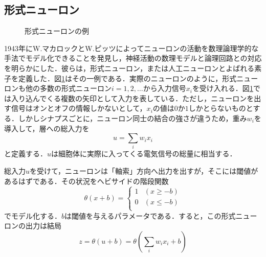 \documentclass[a4paper,11pt]{jsreport}
\begin{document}
\subsection{形式ニューロン}
\begin{figure}[H]
  \centering
  \caption{形式ニューロンの例}
  \label{形式ニューロン}
\end{figure}
1943年にW.マカロックとW.ピッツによってニューロンの活動を数理論理学的な手法でモデル化できることを発見し，神経活動の数理モデルと論理回路との対応を明らかにした．彼らは，形式ニューロン，または人工ニューロンとよばれる素子を定義した．図\ref{形式ニューロン}はその一例である．実際のニューロンのように，形式ニューロンも他の多数の形式ニューロン$i=1,2,\dots$から入力信号$x_i$を受け入れる．図\ref{形式ニューロン}では入り込んでくる複数の矢印として入力を表している．ただし，ニューロンを出す信号はオンとオフの情報しかないとして，$x_i$の値は$0$か$1$しかとらないものとする．しかしシナプスごとに，ニューロン同士の結合の強さが違うため，重み$w_i$を導入して，層への総入力を
\begin{equation}
  u = \sum_{i} w_i x_i
\end{equation}
と定義する．$u$は細胞体に実際に入ってくる電気信号の総量に相当する．\par
総入力$u$を受けて，ニューロンは「軸索」方向へ出力を出すが，そこには閾値があるはずである．その状況をヘビサイドの階段関数
\begin{equation}
  \theta(x+b) = \begin{cases}
    1 & (x \geq -b) \\
    0 & (x \leq -b) \\
  \end{cases}
\end{equation}
でモデル化する．$b$は閾値を与えるパラメータである．すると，この形式ニューロンの出力は結局
\begin{equation}
  z = \theta(u + b) = \theta\left( \sum_{i} w_i x_i + b \right)
\end{equation}
\end{document}
